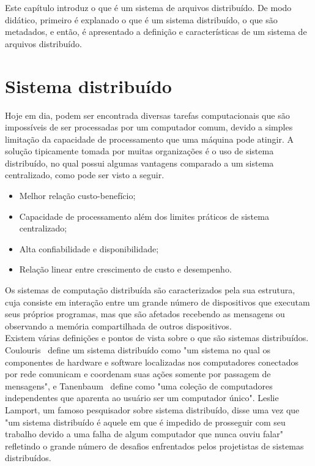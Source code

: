 Este capítulo introduz o que é um sistema de arquivos distribuído. De modo didático, primeiro é explanado o que é um sistema distribuído, o que são metadados, e então, é apresentado a definição e características de um sistema de arquivos distribuído.


	
	\section{Sistema distribuído}
	Hoje em dia, podem ser encontrada diversas tarefas computacionais que são impossíveis de ser processadas por um computador comum, devido a simples limitação da capacidade de processamento que uma máquina pode atingir. A solução tipicamente tomada por muitas organizações é o uso de sistema distribuído, no qual possui algumas vantagens comparado a um sistema centralizado, como pode ser visto a seguir.
	
	\begin{itemize}
		\item Melhor relação custo-benefício;
		\item Capacidade de processamento além dos limites práticos de sistema centralizado;
		\item Alta confiabilidade e disponibilidade;
		\item Relação linear entre crescimento de custo e desempenho.
	\end{itemize}
	Os sistemas de computação distribuída são caracterizados pela sua estrutura, cuja consiste em interação entre um grande número de dispositivos que executam seus próprios programas, mas que são afetados recebendo as mensagens ou observando a memória compartilhada de outros dispositivos.
	\\
	
	Existem várias definições e pontos de vista sobre o que são sistemas distribuídos. Coulouris~\cite{coulouris06} define um sistema distribuído como "um sistema no qual os componentes de hardware e software localizadas nos computadores conectados por rede comunicam e coordenam suas ações somente por passagem de mensagens", e Tanenbaum~\cite{tanenbaum07} define como "uma coleção de computadores independentes que aparenta ao usuário ser um computador único". Leslie Lamport, um famoso pesquisador sobre sistema distribuído, disse uma vez que "um sistema distribuído é aquele em que é impedido de prosseguir com seu trabalho devido a uma falha de algum computador que nunca ouviu falar" refletindo o grande número de desafios enfrentados pelos projetistas de sistemas distribuídos.
	\\
	
